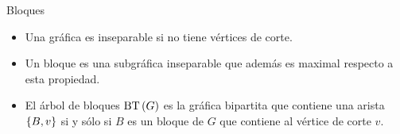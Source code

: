 \documentclass[spanish]{beamer}
\begin{document}
\begin{frame}{Bloques}
  \begin{definitions}[F. Harary -- 1969]
    \begin{itemize}[<+->]
      \item Una gráfica es \alert{inseparable} si no tiene vértices de corte.
      \item Un \alert{bloque} es una subgráfica inseparable que además es 
      maximal respecto a esta propiedad.
      \item El \alert{árbol de bloques} $\mathrm{BT}\left(G\right)$ es la gráfica bipartita que 
      contiene una arista $\left\{{B, v}\right\}$ si y sólo si $B$ es un bloque de $G$ que 
      contiene al vértice de corte $v$.
    \end{itemize}
  \end{definitions}
\end{frame}
\end{document}
